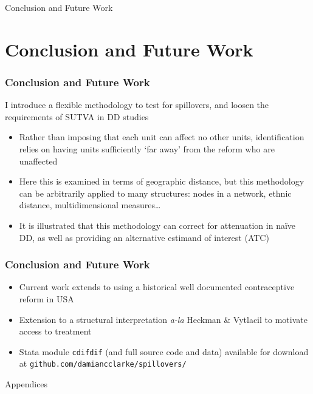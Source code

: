 \documentclass[10pt,letterpaper,subeqn]{beamer}
\begin{document}
\begin{frame}
\begin{center}
\Large Conclusion and Future Work
\end{center}
\end{frame}


\section{Conclusion and Future Work}
\begin{frame}[label=concl]
  \frametitle{Conclusion and Future Work}
I introduce a flexible methodology to test for spillovers, and loosen the 
requirements of SUTVA in DD studies
\vspace{4mm}
\begin{itemize}
\item Rather than imposing that each unit can affect no other units, identification
relies on having units sufficiently `far away' from the reform who are unaffected
\item Here this is examined in terms of geographic distance, but this methodology
can be arbitrarily applied to many structures: nodes in a network, ethnic distance, 
multidimensional measures\ldots
\item It is illustrated that this methodology can correct for attenuation in
na\"ive DD, as well as providing an alternative estimand of interest (ATC)
\end{itemize}
\end{frame}


\begin{frame}[label=future]
  \frametitle{Conclusion and Future Work}
\begin{itemize}
\item Current work extends to using a historical well documented contraceptive
 reform in USA
\item Extension to a structural interpretation \emph{a-la} Heckman \& Vytlacil to
 motivate access to treatment
\item Stata module \texttt{cdifdif} (and full source code and data) 
  available for download at \texttt{github.com/damiancclarke/spillovers/}
\end{itemize}
\end{frame}


\begin{frame}
\begin{center}
\Large Appendices
\end{center}
\end{frame}
\end{document}
